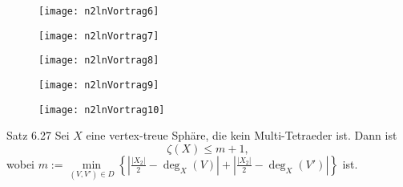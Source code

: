 \documentclass{beamer}
\begin{document}
\begin{frame}
\begin{figure}[H]
\begin{center}
\texttt{[image: n2lnVortrag6]}
\end{center}
\end{figure}
\end{frame}
\begin{frame}
\begin{figure}[H]
\begin{center}
\texttt{[image: n2lnVortrag7]}
\end{center}
\end{figure}
\end{frame}
\begin{frame}
\begin{figure}[H]
\begin{center}
\texttt{[image: n2lnVortrag8]}
\end{center}
\end{figure}
\end{frame}
\begin{frame}
\begin{figure}[H]
\begin{center}
\texttt{[image: n2lnVortrag9]}
\end{center}
\end{figure}
\end{frame}
\begin{frame}
\begin{figure}[H]
\begin{center}
\texttt{[image: n2lnVortrag10]}
\end{center}
\end{figure}
\end{frame}
\begin{frame}
\begin{block}{Satz 6.27}
Sei $X$ eine vertex-treue Sphäre, die kein Multi-Tetraeder ist. Dann ist 
\[
\zeta(X)\leq m+1,
\] wobei $m:=\underset{{(V,V')\in D}}{\min}\left\{\left|\frac{\vert X_2 \vert}{2}-\deg_X(V)\right| +\left| \frac{\vert X_2 \vert}{2}-\deg_X(V')\right|\right\}$
 ist.
\end{block}
\end{frame}
\end{document}
